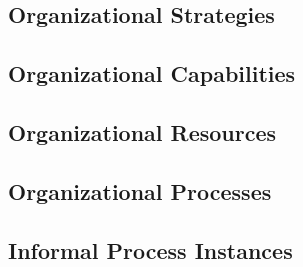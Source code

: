 \subsection{Organizational Strategies} 
\label{sec:strategies}

\subsection{Organizational Capabilities}
\label{sec:capabilities}



\subsection{Organizational Resources} 
\label{sec:resources}



\subsection{Organizational Processes} 
\label{sec:processes}

\subsection{Informal Process Instances} 
\label{sec:ipinstances}
